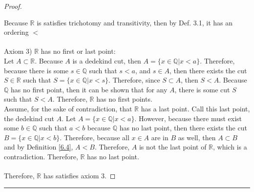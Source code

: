 \documentclass[openany, amssymb, psamsfonts]{amsart}
\newcommand{\bbQ}{\mathbb{Q}}
\newcommand{\bbR}{\mathbb{R}}
\theoremstyle{definition}
\numberwithin{equation}{section}
\begin{document}
\begin{proof}
\begin{enumerate}
\end{enumerate}
Because $\bbR$ is satisfies trichotomy and transitivity, then by Def. 3.1, it has an ordering $<$\\\\
Axiom 3) $\bbR$ has no first or last point:\\
Let $A\subset \bbR$. Because $A$ is a dedekind cut, then $A= \{x\in \bbQ | x<a\}$. Therefore, because there is some $s\in \bbQ$ such that $s<a$, and $s\in A$, then there exists the cut $S\in \bbR$ such that $S = \{x\in \bbQ | x<s\}$. Therefore, since $S\subset A$, then $S<A$. Because $\bbQ$ has no first point, then it can be shown that for any $A$, there is some cut $S$ such that $S<A$. Therefore, $\bbR$ has no first points. \\
Assume, for the sake of contradiction, that $\bbR$ has a last point. Call this last point, the dedekind cut $A$. Let $A = \{x\in \bbQ | x< a\}$. However, because there must exist some $b\in \bbQ$ such that $a<b$ because $\bbQ$ has no last point, then there exists the cut $B = \{x\in \bbQ | x<b\}$. Therefore, because all $x\in A$ are in $B$ as well, then $A\subset B$ and by Definition \ref{6.4}, $A<B$. Therefore, $A$ is not the last point of $\bbR$, which is a contradiction. Therefore, $\bbR$ has no last point.\\\\
Therefore, $\bbR$ has satisfies axiom 3.
\end{proof} \vspace{4pt}     \hrule   \vspace{4pt}
\end{document}
